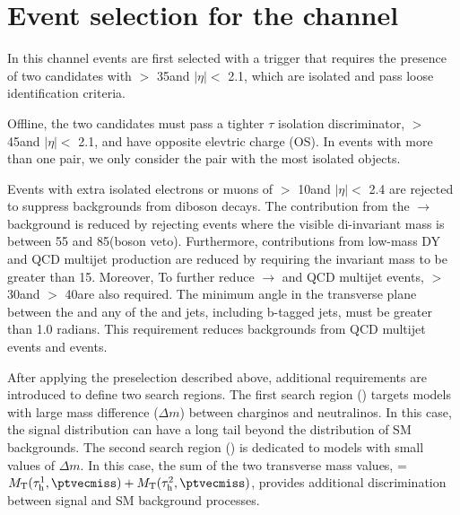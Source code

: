 \section{\texorpdfstring{Event selection for the \tauTau channel}{Event selection for the tau-tau channel}}
\label{sect:tauTauCuts}
In this channel events are first selected with a trigger \cite{Chatrchyan:2011nv}
that requires the presence of
two \Tau candidates with \PT $>$ 35\GeV and $|\eta|<$ 2.1, which are isolated and pass loose identification criteria.

Offline, %
the two \Tau candidates must pass a tighter $\tau$ isolation discriminator,
\PT $>$ 45\GeV and $|\eta|<$ 2.1, and have opposite elevtric charge (OS).
In events with more than one \tauTau pair, we only consider the pair with the most isolated \Tau objects. 

Events with extra isolated electrons or muons of \PT $>$ 10\GeV and $|\eta| <$ 2.4 
are rejected to suppress %
backgrounds from diboson decays.
The contribution from the \Z$ \rightarrow$ background is reduced by rejecting events where the visible
di-\Tau invariant mass is between 55 and 85\GeV (\Z boson veto).  
Furthermore, contributions from low-mass DY and QCD multijet production are 
reduced by requiring the invariant mass to be greater than 15\GeV.
Moreover, To further reduce \Z$\rightarrow$ \tauTau and QCD multijet events, %
\MPT $>$ 30\GeV and \mttwo $>$ 40\GeV are also required.
The minimum angle \deltaphi in the transverse plane between the \ptvecmiss and any of the \Tau and jets, 
including b-tagged jets, must be greater than 1.0 radians. 
This requirement reduces backgrounds from QCD multijet events and \wjets events.

After applying the preselection described above,
additional requirements are introduced to define two search regions.
The first search region (\binone) targets models with large mass difference ($\Delta m$) 
between charginos and neutralinos.
In this case, the \mttwo signal distribution can have a long tail beyond the 
distribution of SM backgrounds.
The second search region (\bintwo) is dedicated to models with small values of $\Delta m$.
In this case, the sum of the two transverse mass values, \SumMT = $\mt(\Tau^1,\ptvecmiss) + \mt(\Tau^2,\ptvecmiss)$, 
provides additional discrimination between signal and SM background processes.

